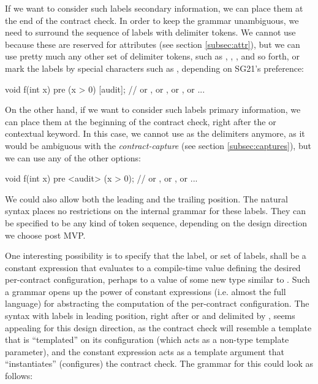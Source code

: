 If we want to consider such labels secondary information, we can place them at the end of the contract check. In order to keep the grammar unambiguous, we need to surround the sequence of labels with delimiter tokens. We cannot use \tcode{[[ ... ]]} because these are reserved for attributes (see section \ref{subsec:attr}), but we can use pretty much any other set of delimiter tokens, such as \mbox{\tcode{[ ...]}}, \mbox{}, \mbox{}, and so forth, or mark the labels by special characters such as , depending on SG21's preference:

\begin{codeblock}
void f(int x)
  pre (x > 0) [audit];   // or , or , or \tcode{[\{audit\}]}, or  ...
\end{codeblock}

On the other hand, if we want to consider such labels primary information, we can place them at the beginning of the contract check, right after the  or  contextual keyword. In this case, we cannot use \mbox{\tcode{[...]}} as the delimiters anymore, as it would be ambiguous with the \emph{contract-capture} (see section \ref{subsec:captures}), but we can use any of the other options:

\begin{codeblock}
void f(int x)
  pre <audit> (x > 0);    // or , or \tcode{[\{audit\}]}, or  ...
\end{codeblock}

We could also allow both the leading and the trailing position. The natural syntax places no restrictions on the internal grammar for these labels. They can be specified to be any kind of token sequence, depending on the design direction we choose post MVP.

One interesting possibility is to specify that the label, or set of labels, shall be a constant expression that evaluates to a compile-time value defining the desired per-contract configuration, perhaps to a value of some new type  similar to . Such a grammar opens up the power of constant expressions (i.e. almost the full language) for abstracting the computation of the per-contract configuration. The syntax with labels in leading position, right after  or  and delimited by \mbox{}, seems appealing for this design direction, as the contract check will resemble a template that is ``templated'' on its configuration (which acts as a non-type template parameter), and the constant expression acts as a template argument that ``instantiates'' (configures) the contract check. The grammar for this could look as follows:

